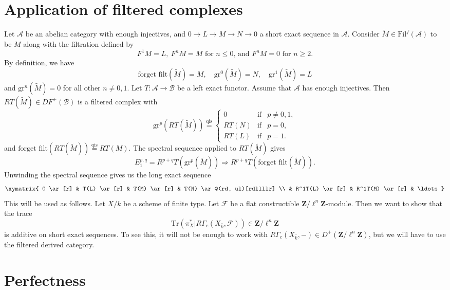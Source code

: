 \section{Application of filtered complexes}
\label{section-applications-filtered}

\noindent
Let $\mathcal{A}$ be an abelian category with enough injectives, and
$0 \to L \to M \to N \to 0$ a short exact sequence in $\mathcal{A}$.
Consider $\widetilde M \in \text{Fil}^f(\mathcal{A})$ to be $M$ along with the
filtration defined by
$$
F^1M = L, \ F^nM = M
\text{ for }n \leq 0\text{, and }F^nM = 0\text{ for }n \geq 2.
$$
By definition, we have
$$
\text{forget filt}(\widetilde M) = M, \quad
\text{gr}^0(\widetilde M) = N, \quad
\text{gr}^1(\widetilde M) = L
$$
and $\text{gr}^n(\widetilde M) = 0$ for all other $n \neq 0, 1$. Let $T:
\mathcal{A} \to \mathcal{B}$ be a left exact functor. Assume that $\mathcal{A}$
has enough injectives. Then $RT(\widetilde M) \in DF^+(\mathcal{B})$ is a
filtered complex with
$$
\text{gr}^p(RT(\widetilde M))
\stackrel{\text{qis}}{=}
\left\{
\begin{matrix}
0 & \text{if} & p \neq 0, 1, \\
RT(N) & \text{if} & p = 0, \\
RT(L) & \text{if} & p = 1.
\end{matrix}
\right.
$$
and $\text{forget filt}(RT(\widetilde M))\stackrel{\text{qis}}{ = } RT(M)$. The
spectral sequence applied to $RT(\widetilde M)$ gives
$$
E_1^{p, q} = R^{p+q}T(\text{gr}^p(\widetilde M)) \Rightarrow
R^{p+q}T(\text{forget filt}(\widetilde M)).
$$
Unwinding the spectral sequence gives us the long exact sequence
$$
\xymatrix{
0 \ar[r] & T(L) \ar[r] & T(M) \ar[r] & T(N) \ar@(rd, ul)[rdllllr] \\
& R^1T(L) \ar[r] & R^1T(M) \ar[r] & \ldots
}
$$
This will be used as follows. Let $X/k$ be a scheme of finite type. Let
$\mathcal{F}$ be a flat constructible $\mathbf{Z}/\ell^n \mathbf{Z}$-module.
Then we want to show that the trace
$$
\text{Tr}( \pi_X^\ast | R\Gamma_c(X_{\bar k}, \mathcal{F})) \in
\mathbf{Z}/\ell^n \mathbf{Z}
$$
is additive on short exact sequences. To see this, it will not be enough to
work with $R\Gamma_c(X_{\bar k}, -) \in D^+(\mathbf{Z}/\ell^n \mathbf{Z})$, but
we will have to use the filtered derived category.







\section{Perfectness}
\label{section-perfect}

